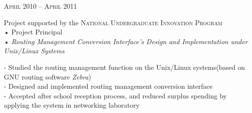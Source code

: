 \documentclass[10pt]{article} %
\begin{document}
\begin{minipage}[t]{0.5\textwidth}
{\raggedleft\textsc{April 2010 -- April 2011}\par}

{\raggedright Project supported by the \textsc{National Undergraduate Innovation Program } \\
 • Project Principal\\
 • \textit{Routing Management Conversion Interface’s Design and
Implementation under Unix/Linux Systems}\\}

\normalsize{
-  Studied the routing management function on the Unix/Linux systems(based on GNU routing software \textit{Zebra})\\
-  Designed and implemented routing management conversion interface\\
-  Accepted after school reception process, and reduced surplus spending by applying the system in networking laboratory
}\\



\end{minipage} %
\hfill
\end{document}
